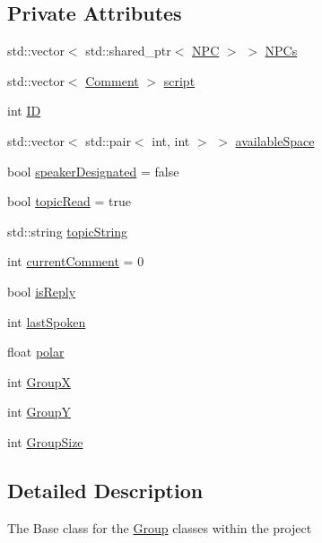 \subsection*{Private Attributes}
\begin{DoxyCompactItemize}
\item 
std\+::vector$<$ std\+::shared\+\_\+ptr$<$ \hyperlink{class_n_p_c}{N\+PC} $>$ $>$ \hyperlink{class_base___group_a4757f3c06c73eea029f71b871c1d863e}{N\+P\+Cs}
\item 
std\+::vector$<$ \hyperlink{class_comment}{Comment} $>$ \hyperlink{class_base___group_a98fbcb0bb85a488e29db9465c18715cc}{script}
\item 
int \hyperlink{class_base___group_ae6ea7525642b45edafb56589d9945f90}{ID}
\item 
std\+::vector$<$ std\+::pair$<$ int, int $>$ $>$ \hyperlink{class_base___group_a8eb46d3107d53da0f5fbea2410b4b095}{available\+Space}
\item 
bool \hyperlink{class_base___group_ae6dfeabc8b679db58666e997653f4cec}{speaker\+Designated} = false
\item 
bool \hyperlink{class_base___group_a48710d3a08af8433d94756b4980ebe65}{topic\+Read} = true
\item 
std\+::string \hyperlink{class_base___group_a20e1ca90be1f271bf2256021d6325dfa}{topic\+String}
\item 
int \hyperlink{class_base___group_a9e1cd9c58ee0f2a67c3df992a553d625}{current\+Comment} = 0
\item 
bool \hyperlink{class_base___group_ad9dc72068ed8309820873de4084aa602}{is\+Reply}
\item 
int \hyperlink{class_base___group_aa031e7ea2c490eae2e8101fb4093da00}{last\+Spoken}
\item 
float \hyperlink{class_base___group_a0c2dfa52ac107ec9564bfc42917e8ce0}{polar}
\item 
int \hyperlink{class_base___group_a039388ca2feb6e676829839d9a3ff543}{GroupX}
\item 
int \hyperlink{class_base___group_adf6cb605c43eaa82f21150e84c629e17}{GroupY}
\item 
int \hyperlink{class_base___group_a44130e3b109f8fb9fb0142fda2a67b07}{Group\+Size}
\end{DoxyCompactItemize}


\subsection{Detailed Description}
The Base class for the \hyperlink{class_group}{Group} classes within the project 

